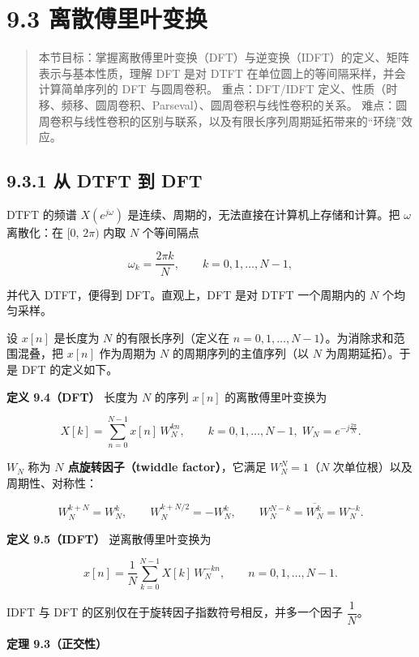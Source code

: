 \section{9.3
离散傅里叶变换}\label{ux79bbux6563ux5085ux91ccux53f6ux53d8ux6362}

\begin{quote}
本节目标：掌握离散傅里叶变换（DFT）与逆变换（IDFT）的定义、矩阵表示与基本性质，理解
DFT 是对 DTFT 在单位圆上的等间隔采样，并会计算简单序列的 DFT
与圆周卷积。 重点：DFT/IDFT
定义、性质（时移、频移、圆周卷积、Parseval）、圆周卷积与线性卷积的关系。
难点：圆周卷积与线性卷积的区别与联系，以及有限长序列周期延拓带来的``环绕''效应。
\end{quote}

\subsection{9.3.1 从 DTFT 到 DFT}\label{ux4ece-dtft-ux5230-dft}

DTFT 的频谱 \(X(e^{j\omega})\)
是连续、周期的，无法直接在计算机上存储和计算。把 \(\omega\) 离散化：在
\([0,\,2\pi)\) 内取 \(N\) 个等间隔点

\[
\omega_k = \frac{2\pi k}{N},\qquad k=0,1,\ldots,N-1,
\]

并代入 DTFT，便得到 DFT。直观上，DFT 是对 DTFT 一个周期内的 \(N\)
个均匀采样。

设 \(x[n]\) 是长度为 \(N\) 的有限长序列（定义在
\(n=0,1,\ldots,N-1\)）。为消除求和范围混叠，把 \(x[n]\) 作为周期为 \(N\)
的周期序列的主值序列（以 \(N\) 为周期延拓）。于是 DFT 的定义如下。

\textbf{定义 9.4（DFT）} 长度为 \(N\) 的序列 \(x[n]\) 的离散傅里叶变换为

\[
\boxed{\;X[k] = \sum_{n=0}^{N-1} x[n]\,W_N^{kn},\qquad k=0,1,\ldots,N-1,\; W_N = e^{-j\frac{2\pi}{N}}.\;}
\]

\(W_N\) 称为 \textbf{\(N\) 点旋转因子（twiddle factor）}，它满足
\(W_N^N=1\)（\(N\) 次单位根）以及周期性、对称性：

\[
W_N^{k+N}=W_N^{k},\qquad W_N^{k+N/2}=-W_N^{k},\qquad W_N^{N-k}=\overline{W_N^{k}}=W_N^{-k}.
\]

\textbf{定义 9.5（IDFT）} 逆离散傅里叶变换为

\[
\boxed{\;x[n] = \frac{1}{N}\sum_{k=0}^{N-1} X[k]\,W_N^{-kn},\qquad n=0,1,\ldots,N-1.\;}
\]

IDFT 与 DFT 的区别仅在于旋转因子指数符号相反，并多一个因子
\(\dfrac{1}{N}\)。

\textbf{定理 9.3（正交性）}

